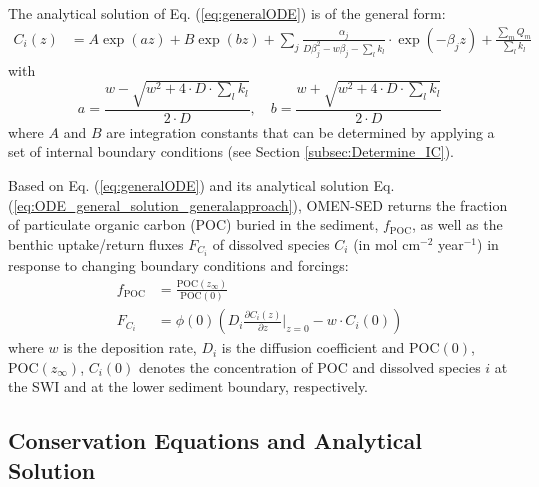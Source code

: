\documentclass[gmd, manuscript]{copernicus}
\begin{document}
The analytical solution of Eq. (\ref{eq:generalODE}) is of the general form:
\begin{align}
 C_i(z) &= A \exp(az) + B  \exp(bz) + \sum_j \frac{\alpha_j}{D \beta_j^2-w\beta_j- \sum_l k_l}\cdot \exp(-\beta_j z) + \frac{\sum_m Q_m}{\sum_l k_l} \label{eq:ODE_general_solution_generalapproach}
\end{align}
with 
\begin{equation} 
 a = \frac{w - \sqrt{w^2+4\cdot D\cdot \sum_l k_l}}{2\cdot D}, \quad b = \frac{w + \sqrt{w^2+4\cdot D\cdot \sum_l k_l}}{2\cdot D}
\end{equation}
where $A$ and $B$ are integration constants that can be determined by applying a set of internal boundary conditions (see Section \ref{subsec:Determine_IC}).

Based on Eq. (\ref{eq:generalODE}) and its analytical solution Eq. (\ref{eq:ODE_general_solution_generalapproach}), OMEN-SED returns the fraction of particulate organic carbon (POC) buried in the sediment, 
$f_{\mathrm{POC}}$, as well as the benthic uptake/return fluxes $F_{C_i}$ of dissolved species $C_i$ (in mol cm$^{-2}$ year$^{-1}$) in response to changing boundary conditions and forcings:
\begin{align}
f_{\mathrm{POC}} &= \frac{\mathrm{POC}(z_\infty)}{\mathrm{POC}(0)} \label{f_POC_pres}\\
F_{C_i} &= \phi(0) \left(D_i \frac{\partial C_i(z)}{\partial z}\bigg\rvert_{z=0} - w \cdot C_i(0) \right) \label{Eq:F_Ci_SWIflux}
\end{align}
where $w$ is the deposition rate, $D_i$ is the diffusion coefficient and $\mathrm{POC}(0)$, $\mathrm{POC}(z_\infty)$, $C_i(0)$ denotes the concentration of POC and dissolved species $i$ at the SWI and 
at the lower sediment boundary, respectively.


\subsection{Conservation Equations and Analytical Solution}\label{subsec:ReactionNetwork}
\end{document}
